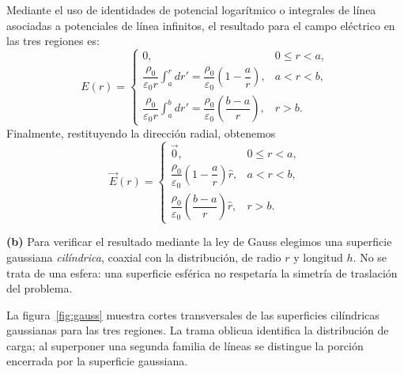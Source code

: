 \documentclass[11pt]{article}
\newcommand{\inciso}[1]{%
  \vspace{0.35em}
  \noindent\textbf{(#1)}\enspace}
\begin{document}
Mediante el uso de identidades de potencial logarítmico o integrales de línea asociadas a potenciales de línea infinitos, el resultado para el campo eléctrico en las tres regiones es:
\[
E(r)=
\begin{cases}
0, & 0\leq r<a,\\[4pt]
\dfrac{\rho_0}{\varepsilon_0 r}\displaystyle\int_a^r dr'
=\dfrac{\rho_0}{\varepsilon_0}\left(1-\dfrac{a}{r}\right),
& a<r<b,\\[10pt]
\dfrac{\rho_0}{\varepsilon_0 r}\displaystyle\int_a^b dr'
=\dfrac{\rho_0}{\varepsilon_0}\left(\dfrac{b-a}{r}\right),
& r>b.
\end{cases}
\]
Finalmente, restituyendo la dirección radial, obtenemos
\begin{equation}
\boxed{
\vec E(r)=
\begin{cases}
\vec 0, & 0\leq r<a,\\[4pt]
\dfrac{\rho_0}{\varepsilon_0}
\left(1-\dfrac{a}{r}\right)\hat{r}, & a<r<b,\\[9pt]
\dfrac{\rho_0}{\varepsilon_0}
\left(\dfrac{b-a}{r}\right)\hat{r}, & r>b.
\end{cases}}
\label{eq:campo-regiones}
\end{equation}

\inciso{b} Para verificar el resultado mediante la ley de Gauss elegimos una
superficie gaussiana
\emph{cilíndrica}, coaxial con la distribución, de radio $r$ y longitud $h$. No se
trata de una esfera: una superficie esférica no respetaría la simetría de traslación
del problema.

La figura~\ref{fig:gauss} muestra cortes transversales de las superficies cilíndricas
gaussianas para las tres regiones. La trama oblicua identifica la distribución de
carga; al superponer una segunda familia de líneas se distingue la porción encerrada
por la superficie gaussiana.
\end{document}
